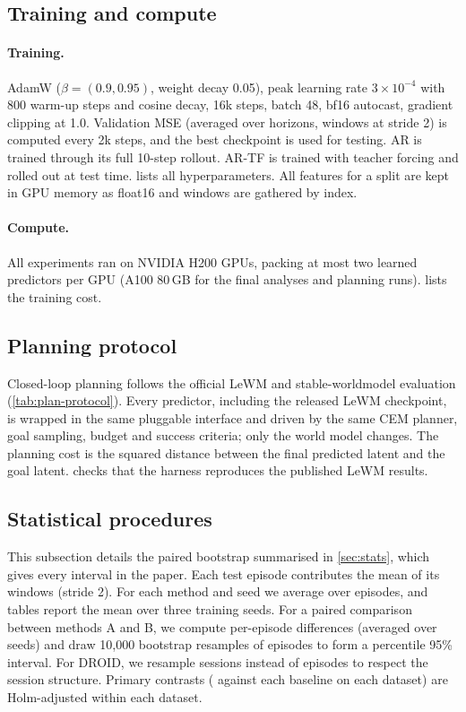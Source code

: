 \FloatBarrier
\subsection{Training and compute}\label{app:training}
\paragraph{Training.} AdamW ($\beta{=}(0.9,0.95)$, weight decay 0.05), peak learning rate
$3{\times}10^{-4}$ with 800 warm-up steps and cosine decay, 16k steps, batch 48, bf16 autocast,
gradient clipping at 1.0. Validation MSE (averaged over horizons, windows at stride 2) is computed
every 2k steps, and the best checkpoint is used for testing. AR is trained through its full
10-step rollout. AR-TF is trained with teacher forcing and rolled out at test time.  lists all
hyperparameters. All features for
a split are kept in GPU memory as float16 and windows are gathered by index.



\paragraph{Compute.} All experiments ran on NVIDIA H200 GPUs, packing at most two learned predictors
per GPU (A100 80\,GB for the final analyses and planning runs).  lists the training cost.

\FloatBarrier
\subsection{Planning protocol}\label{app:planning}
Closed-loop planning follows the official LeWM and stable-worldmodel evaluation (\cref{tab:plan-protocol}). Every
predictor, including the released LeWM checkpoint, is wrapped in the same pluggable interface and driven by the same CEM
planner, goal sampling, budget and success criteria; only the world model changes. The planning cost is the squared
distance between the final predicted latent and the goal latent.  checks that the harness
reproduces the published LeWM results.

\FloatBarrier
\subsection{Statistical procedures}\label{app:stats}
This subsection details the paired bootstrap summarised in \cref{sec:stats}, which gives every interval in the paper.
Each test episode contributes the mean of its windows (stride 2). For each method and seed we
average over episodes, and tables report the mean over three training seeds. For a paired
comparison between methods A and B, we compute per-episode differences (averaged over seeds) and
draw 10{,}000 bootstrap resamples of episodes to form a percentile 95\% interval. For DROID, we
resample sessions instead of episodes to respect the session structure. Primary contrasts (\ours{}
against each baseline on each dataset) are Holm-adjusted within each dataset.
\FloatBarrier
